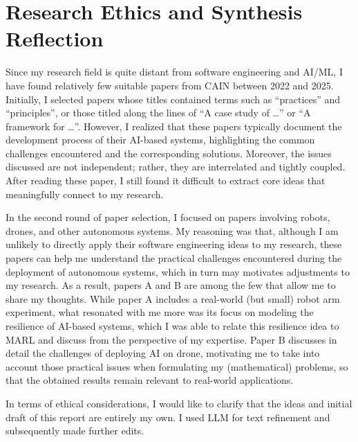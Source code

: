 \documentclass[11pt]{article}
\begin{document}
\begin{enumerate}
\end{enumerate}

\section{Research Ethics and Synthesis Reflection}
Since my research field is quite distant from software engineering and AI/ML, I have found relatively few suitable papers from CAIN between 2022 and 2025. Initially, I selected papers whose titles contained terms such as “practices” and “principles”, or those titled along the lines of “A case study of …” or “A framework for …”. However, I realized that these papers typically document the development process of their AI-based systems, highlighting the common challenges encountered and the corresponding solutions. Moreover, the issues discussed are not independent; rather, they are interrelated and tightly coupled. After reading these paper, I still found it difficult to extract core ideas that meaningfully connect to my research.

In the second round of paper selection, I focused on papers involving robots, drones, and other autonomous systems. My reasoning was that, although I am unlikely to directly apply their software engineering ideas to my research, these papers can help me understand the practical challenges encountered during the deployment of autonomous systems, which in turn may motivates adjustments to my research. As a result, papers A and B are among the few that allow me to share my thoughts. While paper A includes a real-world (but small) robot arm experiment, what resonated with me more was its focus on modeling the resilience of AI-based systems, which I was able to relate this resilience idea to MARL and discuss from the perspective of my expertise. Paper B discusses in detail the challenges of deploying AI on drone, motivating me to take into account those practical issues when formulating my (mathematical) problems, so that the obtained results remain relevant to real-world applications.

In terms of ethical considerations, I would like to clarify that the ideas and initial draft of this report are entirely my own. I used LLM for text refinement and subsequently made further edits.
\end{document}
